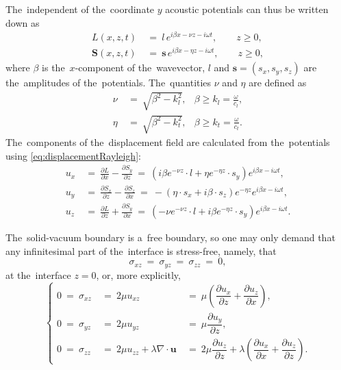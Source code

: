 The~independent of the~coordinate $y$ acoustic potentials can thus be written down as
\begin{align}
L(x,z,t)~&=~l\,e^{i\beta x-\nu z-i\omega t}, \qquad z \ge 0, \\
\mathbf{S}(x,z,t)~&=~\mathbf{s}\,e^{i\beta x-\eta z-i\omega t}, \qquad z \ge 0,
\end{align}
where $\beta$ is the~$x$-component of the~wavevector, $l$ and $\mathbf{s} = (s_x, s_y, s_z)$ are the~amplitudes of the~potentials.
The~quantities $\nu$ and $\eta$ are defined as
\begin{align}
\nu~&=~\sqrt{\beta^2-k_l^2}, &\beta \ge k_l=\frac{\omega}{c_l}, \label{eq:nuRayleigh}\\
\eta~&=~\sqrt{\beta^2-k_t^2}, &\beta \ge k_t=\frac{\omega}{c_t}. \label{eq:etaRayleigh}
\end{align}
%
The~components of the~displacement field are calculated from the~potentials using \cref{eq:displacementRayleigh}:
\begin{align}
u_x~&=~\frac{\partial L}{\partial x} - \frac{\partial S_y}{\partial z}~=~\left(i\beta e^{-\nu z}\cdot l+\eta e^{-\eta z}\cdot s_y\right)e^{i\beta x-i\omega t}, \label{eq:uxRayleigh}\\
u_y~&=~\frac{\partial S_x}{\partial z} - \frac{\partial S_z}{\partial x}~=~-\left(\eta\cdot s_x+i\beta \cdot s_z\right)e^{-\eta z}e^{i\beta x-i\omega t}, \label{eq:uyRayleigh}\\
u_z~&=~\frac{\partial L}{\partial z} + \frac{\partial S_y}{\partial x}~=~\left(-\nu e^{-\nu z}\cdot l+i\beta e^{-\eta z}\cdot s_y\right)e^{i\beta x-i\omega t}. \label{eq:uzRayleigh}
\end{align}

The~solid-vacuum boundary is a~free boundary, so one may only demand that any infinitesimal part of the~interface is stress-free, namely, that
\begin{equation}
\sigma_{xz}~=~\sigma_{yz}~=~\sigma_{zz}~=~0,
\end{equation}
at the~interface $z=0$, or, more explicitly,
\begin{equation}
\label{eq:sigmaxzyzzzRayleigh}
\left\{\begin{array}{rll}
0~=~\sigma_{xz}~&=~2\mu u_{xz}~&=~\mu \left(\dfrac{\partial u_x}{\partial z}+\dfrac{\partial u_z}{\partial x}\right), \\
0~=~\sigma_{yz}~&=~2\mu u_{yz}~&=~\mu \dfrac{\partial u_y}{\partial z}, \\
0~=~\sigma_{zz}~&=~2\mu u_{zz}+\lambda \nabla\cdot\mathbf{u}~&=~2\mu \dfrac{\partial u_z}{\partial z} + \lambda\left(\dfrac{\partial u_x}{\partial x}+\dfrac{\partial u_z}{\partial z}\right).
\end{array}\right.
\end{equation}

